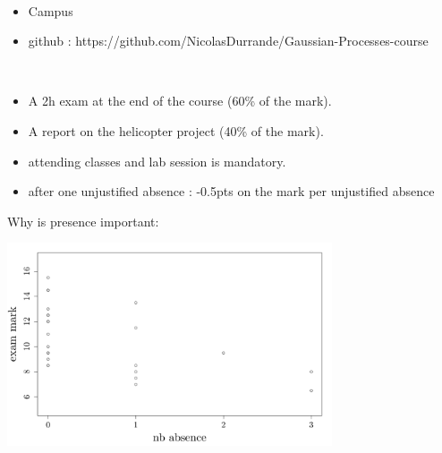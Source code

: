 \documentclass{beamer}
\begin{document}
\begin{frame}{}

\vspace{0.5cm}
\\
\begin{itemize}
	\item Campus
	\item github : https://github.com/NicolasDurrande/Gaussian-Processes-course
\end{itemize}

\vspace{0.5cm}
\\
\begin{itemize}
	\item A 2h exam at the end of the course (60\% of the mark).
	\item A report on the helicopter project (40\% of the mark).
\end{itemize}

\vspace{5mm}
\begin{itemize}
	\item attending classes and lab session is mandatory.
	\item after one unjustified absence : -0.5pts on the mark per unjustified absence
\end{itemize}
\end{frame}

\begin{frame}{}
Why is presence important:
\begin{center}
  \includegraphics[height=6cm]{figures/notes_vs_abs.pdf}
\end{center}
\end{frame}
\end{document}
